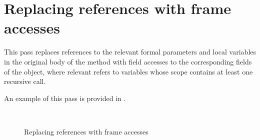 \section{Replacing references with frame accesses}

This pass replaces references to the relevant formal parameters and local variables in the original body of the method
with field accesses to the corresponding fields of the  object, where relevant refers to variables whose
scope contains at least one recursive call.

An example of this pass is provided in .

\begin{figure}[htb]
    \\
    \caption{Replacing references with frame accesses \label{img:replace-identifier}}
\end{figure}